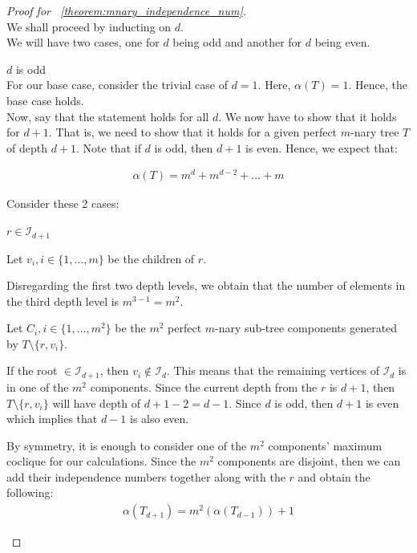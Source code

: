 \documentclass{amsart}
\theoremstyle{definition}
\begin{document}
\begin{proof}[Proof for ~\ref{theorem:mnary_independence_num}]
	$ $ \\
	We shall proceed by inducting on $d$.\\
	We will have two cases, one for $d$ being odd and another for $d$ being even.
	\begin{caseof}
		\item $d$ is odd \\

		For our base case, consider the trivial case of $d = 1$. Here, $\alpha(T) = 1$. Hence, the base case holds. \\

		Now, say that the statement holds for all $d$. We now have to show that it holds for $d+1$. That is, we need to show that it holds for a given perfect $m$-nary tree $T$ of depth $d + 1$. Note that if $d$ is odd, then $d + 1$ is even. Hence, we expect that:

		\begin{align*}
			\alpha(T) = m^d + m^{d - 2} + \ldots + m 
		\end{align*}

		Consider these 2 cases:

		\begin{subcaseof}
		\item $r \in \mathcal{I}_{d + 1}$

			Let $v_i, i \in \{1, \dots, m\}$ be the children of $r$.

			Disregarding the first two depth levels, we obtain that the number of elements in the third depth level is $m^{3-1} = m^2$.

			Let $C_i, i \in \{1,\dots, m^2\}$ be the $m^2$ perfect $m$-nary sub-tree components generated by $T \setminus \{r, v_i\}$.

			If the root $\in \mathcal{I}_{d + 1}$, then $v_i \not\in \mathcal{I}_d$. This means that the remaining vertices of $\mathcal{I}_d$ is in one of the $m^2$ components.
			Since the current depth from the $r$ is $d + 1$, then $T \setminus \{r, v_i\}$ will have depth of $d + 1 - 2 = d - 1$. Since $d$ is odd, then $d + 1$ is even which implies that $d - 1$ is also even.

			By symmetry, it is enough to consider one of the $m^2$ components' maximum coclique for our calculations. Since the $m^2$ components are disjoint, then we can add their independence numbers together along with the $r$ and obtain the following:
			\begin{align*}
				\alpha(T_{d + 1}) = m^2(\alpha(T_{d - 1})) + 1
			\end{align*}


\end{subcaseof}
\end{caseof}
\end{proof}
\end{document}
